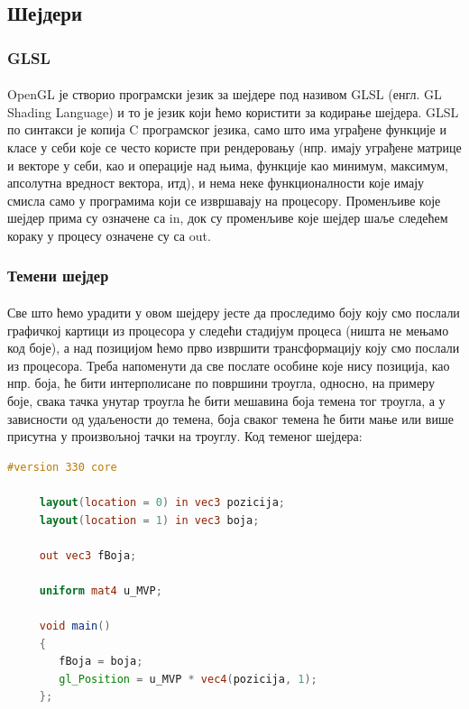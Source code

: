\documentclass[12pt]{article}
\begin{document}
	\subsection{Шејдери}
	
	\subsubsection{GLSL}
	\paragraph{}
	OpenGL је створио програмски језик за шејдере под називом GLSL (енгл. GL Shading Language) и то је језик који ћемо користити за кодирање шејдера. GLSL по синтакси је копија C програмског језика, само што има уграђене функције и класе у себи које се често користе при рендеровању (нпр. имају уграђене матрице и векторе у себи, као и операције над њима, функције као минимум, максимум, апсолутна вредност вектора, итд), и нема неке функционалности које имају смисла само у програмима који се извршавају на процесору. Променљиве које шејдер прима су означене са in, док су променљиве које шејдер шаље следећем кораку у процесу означене су са out.
	
	\subsubsection{Темени шејдер}
	\paragraph{}
	  Све што ћемо урадити у овом шејдеру јесте да проследимо боју коју смо послали графичкој картици из процесора у следећи стадијум процеса (ништа не мењамо код боје), а над позицијом ћемо прво извршити трансформацију коју смо послали из процесора. Треба напоменути да све послате особине које нису позиција, као нпр. боја, ће бити интерполисане по површини троугла, односно, на примеру боје, свака тачка унутар троугла ће бити мешавина боја темена тог троугла, а у зависности од удаљености до темена, боја сваког темена ће бити мање или више присутна у произвољној тачки на троуглу. Код теменог шејдера:
	 \begin{lstlisting}[language=GLSL]
	 #version 330 core
	 
	 layout(location = 0) in vec3 pozicija;
	 layout(location = 1) in vec3 boja;
	 
	 out vec3 fBoja;
	 
	 uniform mat4 u_MVP;
	 
	 void main()
	 {	 
	 	fBoja = boja;
	 	gl_Position = u_MVP * vec4(pozicija, 1);
	 };
	 \end{lstlisting}
		
\end{document}
